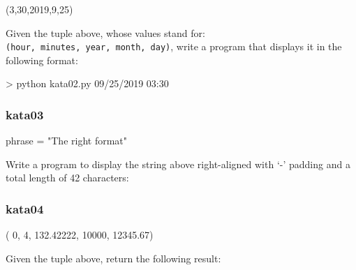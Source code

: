 \documentclass[]{article}
\newenvironment{Shaded}{\begin{snugshade}}{\end{snugshade}}
\newcommand{\NormalTok}[1]{\textcolor[rgb]{0.81,0.81,0.76}{#1}}
\begin{document}
\begin{Shaded}
\begin{Highlighting}[]
\NormalTok{(3,30,2019,9,25)}
\end{Highlighting}
\end{Shaded}

Given the tuple above, whose values stand for:
\texttt{(hour,\ minutes,\ year,\ month,\ day)}, write a program that
displays it in the following format:

\begin{Shaded}
\begin{Highlighting}[]
\NormalTok{> python kata02.py}
\NormalTok{09/25/2019 03:30}
\end{Highlighting}
\end{Shaded}

\hypertarget{kata03}{%
\subsubsection{kata03}\label{kata03}}

\begin{Shaded}
\begin{Highlighting}[]
\NormalTok{phrase = "The right format"}
\end{Highlighting}
\end{Shaded}

Write a program to display the string above right-aligned with `-'
padding and a total length of 42 characters:

\begin{Shaded}
\end{Shaded}

\hypertarget{kata04}{%
\subsubsection{kata04}\label{kata04}}

\begin{Shaded}
\begin{Highlighting}[]
\NormalTok{( 0, 4, 132.42222, 10000, 12345.67)}
\end{Highlighting}
\end{Shaded}

Given the tuple above, return the following result:
\end{document}
